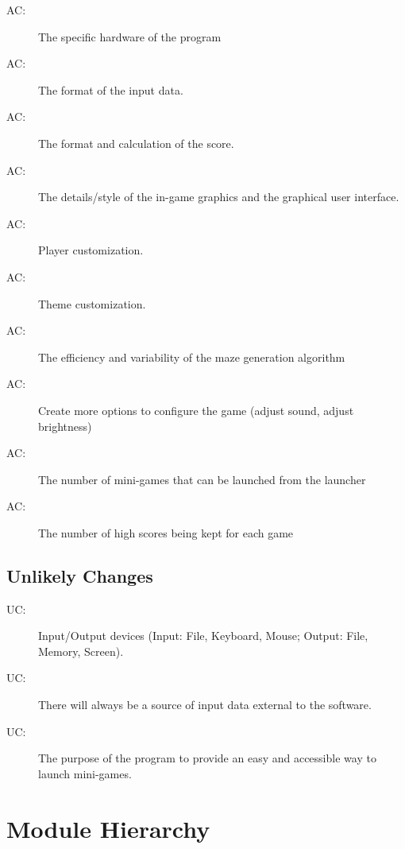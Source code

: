\documentclass[12pt, titlepage]{article}
\newcounter{acnum}
\newcommand{\actheacnum}{AC\theacnum}
\newcounter{ucnum}
\newcommand{\uctheucnum}{UC\theucnum}
\begin{document}
\begin{description}
\item[ \actheacnum \label{acHH}:] The specific hardware of the program
\item[ \actheacnum \label{acInput}:] The format of the input data.
\item[ \actheacnum \label{acScore}:] The format and calculation of the score.
\item[ \actheacnum \label{acGraphics}:] The details/style of the in-game graphics and the graphical user interface.
\item[ \actheacnum \label{acCharacter}:] Player customization.
\item[ \actheacnum \label{acTheme}:] Theme customization.
\item[ \actheacnum \label{acMazeAlg}:] The efficiency and variability of the maze generation algorithm
\item[ \actheacnum \label{acSettings}:] Create more options to configure the game (adjust sound, adjust brightness)
\item[ \actheacnum \label{acGames}:] The number of mini-games that can be launched from the launcher
\item[ \actheacnum \label{acBoardSize}:] The number of high scores being kept for each game
\end{description}

\subsection{Unlikely Changes} \label{SecUchange}

\begin{description}
\item[ \uctheucnum \label{ucIO}:] Input/Output devices (Input: File, Keyboard, Mouse; Output: File, Memory, Screen).
\item[ \uctheucnum \label{ucInput}:] There will always be a source of input data external to the software.
\item[ \uctheucnum \label{ucPurpose}:] The purpose of the program to provide an easy and accessible way to launch mini-games.
\end{description}

\section{Module Hierarchy} \label{SecMH}
\end{document}
